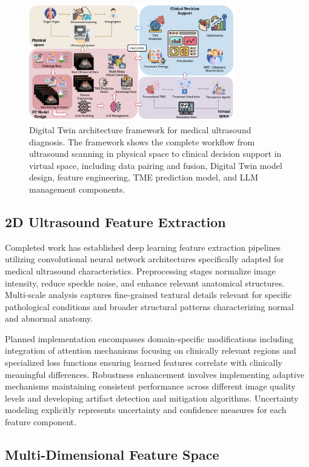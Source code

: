 \begin{figure}[htbp]
\centering
\includegraphics[width=0.8\textwidth]{figures/Med/med_framework.png}
\caption{Digital Twin architecture framework for medical ultrasound diagnosis. The framework shows the complete workflow from ultrasound scanning in physical space to clinical decision support in virtual space, including data pairing and fusion, Digital Twin model design, feature engineering, TME prediction model, and LLM management components.}
\label{fig:med_framework}
\end{figure}

\subsection{2D Ultrasound Feature Extraction}

Completed work has established deep learning feature extraction pipelines utilizing convolutional neural network architectures specifically adapted for medical ultrasound characteristics. Preprocessing stages normalize image intensity, reduce speckle noise, and enhance relevant anatomical structures. Multi-scale analysis captures fine-grained textural details relevant for specific pathological conditions and broader structural patterns characterizing normal and abnormal anatomy.

Planned implementation encompasses domain-specific modifications including integration of attention mechanisms focusing on clinically relevant regions and specialized loss functions ensuring learned features correlate with clinically meaningful differences. Robustness enhancement involves implementing adaptive mechanisms maintaining consistent performance across different image quality levels and developing artifact detection and mitigation algorithms. Uncertainty modeling explicitly represents uncertainty and confidence measures for each feature component.

\subsection{Multi-Dimensional Feature Space}

